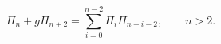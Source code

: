 \begin{equation}\label{SD}
    \Pi_n+g\Pi_{n+2}=\sum_{i=0}^{n-2}\Pi_i\Pi_{n-i-2}, \qquad n>2.
\end{equation}

